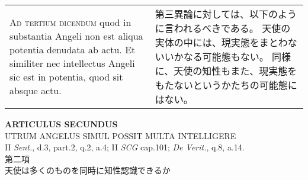 \documentclass[10pt]{jsarticle} %
\begin{document}
\begin{longtable}{p{21em}p{21em}}
\\


{\scshape Ad tertium dicendum} quod in substantia Angeli
non est aliqua potentia denudata ab actu. Et similiter nec intellectus
Angeli sic est in potentia, quod sit absque actu.


&

第三異論に対しては、以下のように言われるべきである。
天使の実体の中には、現実態をまとわないいかなる可能態もない。
同様に、天使の知性もまた、現実態をもたないというかたちの可能態にはない。


\end{longtable}

\newpage


\begin{center}
{\Large {\bf ARTICULUS SECUNDUS}}\\
{\large UTRUM ANGELUS SIMUL POSSIT MULTA INTELLIGERE}\\
{\footnotesize II {\itshape Sent.}, d.3, part.2, q.2, a.4; II {\itshape
SCG} cap.101; {\itshape De Verit.}, q.8, a.14.}\\
{\Large 第二項\\天使は多くのものを同時に知性認識できるか}
\end{center}
\end{document}
